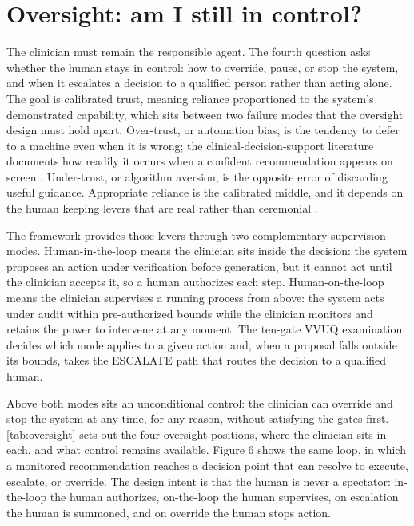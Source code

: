 \section{Oversight: am I still in control?}
\label{sec:oversight}

The clinician must remain the responsible agent. The fourth question asks whether
the human stays in control: how to override, pause, or stop the system, and when it
escalates a decision to a qualified person rather than acting alone. The goal is
calibrated trust, meaning reliance proportioned to the system's demonstrated
capability, which sits between two failure modes that the oversight design must
hold apart.
Over-trust, or automation bias, is the tendency to defer to a machine even when it
is wrong; the clinical-decision-support literature documents how readily it occurs
when a confident recommendation appears on screen \cite{goddard2012automation}.
Under-trust, or algorithm aversion, is the opposite error of discarding useful
guidance. Appropriate reliance is the calibrated middle, and it depends on the
human keeping levers that are real rather than ceremonial \cite{lee2004trust}.

The framework provides those levers through two complementary supervision modes.
Human-in-the-loop means the clinician sits inside the decision: the system proposes
an action under verification before generation, but it cannot act until the
clinician accepts it, so a human authorizes each step. Human-on-the-loop means the
clinician supervises a running process from above: the system acts under audit
within pre-authorized bounds while the clinician monitors and retains the power to
intervene at any moment. The ten-gate VVUQ examination decides which mode applies
to a given action and, when a proposal falls outside its bounds, takes the ESCALATE
path that routes the decision to a qualified human.

Above both modes sits an unconditional control: the clinician can override and stop
the system at any time, for any reason, without satisfying the gates first.
\autoref{tab:oversight} sets out the four oversight positions, where the clinician
sits in each, and what control remains available. Figure 6 shows the same loop, in
which a monitored recommendation reaches a decision point that can resolve to
execute, escalate, or override. The design intent is that the human is never a
spectator: in-the-loop the human authorizes, on-the-loop the human supervises, on
escalation the human is summoned, and on override the human stops action.

